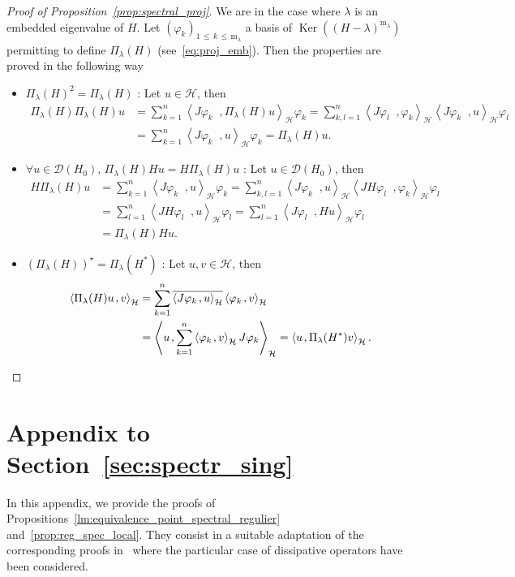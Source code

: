 \documentclass[10pt]{amsart}
\theoremstyle{definition}\newtheorem{defi}[theo]{Definition}\newtheorem{rema}[theo]{Remark}\newtheorem{exam}[theo]{Example}\newtheorem{exem}[theo]{Example}\newtheorem{nota}[theo]{Notation}
\newcommand{\Hi}{\mathcal{H}}
\newcommand{\rmm}{\mathrm{m}}
\newcommand{\scal}[2]{\left\langle{#1} \middle., {#2}\right\rangle}
\newcommand{\clD}{\mathcal{D}}
\DeclareMathOperator{\Ker}{Ker}
\let\oldforall\forall
\renewcommand*{\forall}{\mathrel{\oldforall}}
\begin{document}
\begin{proof}[Proof of Proposition~\ref{prop:spectral_proj}]
We are in the case where $\lambda$ is an embedded eigenvalue of $H$. Let $(\varphi_k)_{1\,\leq\,k\,\leq\,\rmm_\lambda}$ a basis of $\Ker((H-\lambda)^{\rmm_\lambda})$ permitting to define $\Pi_\lambda(H)$ (see~\eqref{eq:proj_emb}). Then the properties are proved in the following way
\begin{itemize}
\item $\Pi_\lambda(H)^2=\Pi_\lambda(H)$ : Let $u\in\Hi$, then
\begin{align*}
\Pi_\lambda(H)\Pi_\lambda(H)u&=\sum_{k=1}^n\scal{J\varphi_k}{\Pi_\lambda(H)u}_\Hi\varphi_k=\sum_{k,l=1}^n\scal{J\varphi_l}{\varphi_k}_\Hi\scal{J\varphi_k}{u}_\Hi\varphi_l\\
&=\sum_{k=1}^n\scal{J\varphi_k}{u}_\Hi\varphi_k=\Pi_\lambda(H)u.
\end{align*}
\item $\forall u\in\clD(H_0)$, $\Pi_\lambda(H)Hu=H\Pi_\lambda(H)u$ : Let $u\in\clD(H_0)$, then
\begin{align*}
H\Pi_\lambda(H)u&=\sum_{k=1}^n\scal{J\varphi_k}{u}_\Hi\varphi_k=\sum_{k,l=1}^n\scal{J\varphi_k}{u}_\Hi\scal{JH\varphi_l}{\varphi_k}_\Hi\varphi_l\\
&=\sum_{l=1}^n\scal{JH\varphi_l}{u}_\Hi\varphi_l=\sum_{l=1}^n\scal{J\varphi_l}{Hu}_\Hi\varphi_l\\
&=\Pi_\lambda(H)Hu.
\end{align*}
\item $(\Pi_\lambda(H))^\star=\Pi_\lambda(H^*)$ : Let $u,v\in\Hi$, then
\begin{align*}
\scal{\Pi_\lambda(H)u}{v}_\Hi&=\sum_{k=1}^n\overline{\scal{J\varphi_k}{u}_\Hi}\scal{\varphi_k}{v}_\Hi\\
&=\scal{u}{\sum_{k=1}^n\scal{\varphi_k}{v}_\Hi J\varphi_k}_\Hi=\scal{u}{\Pi_\lambda(H^*)v}_\Hi.\qedhere
\end{align*}
\end{itemize}
\end{proof}

\section{Appendix to Section~\ref{sec:spectr_sing}}\label{App:Propriétés_point_spect_reg}

In this appendix, we provide the proofs of Propositions~\ref{lm:equivalence_point_spectral_regulier} and~\ref{prop:reg_spec_local}. They consist in a suitable adaptation of the corresponding proofs in~\cite{FaNi18_01} where the particular case of dissipative operators have been considered.
\end{document}
